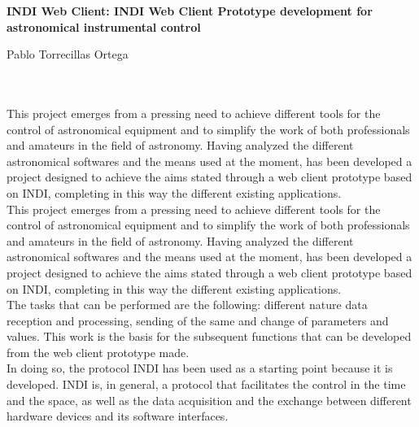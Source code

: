 \cleardoublepage


\thispagestyle{empty}


\begin{center}
{\large\bfseries INDI Web Client: INDI Web Client Prototype development for astronomical instrumental control}\\
\end{center}
\begin{center}
Pablo Torrecillas Ortega\\
\end{center}

\\

\vspace{0.7cm}
\\

This project emerges from a pressing need to achieve different tools for the control of astronomical equipment and to simplify the work of both professionals and amateurs in the field of astronomy. Having analyzed the different astronomical softwares and the means used at the moment, has been developed a project designed to achieve the aims stated through a web client prototype based on INDI, completing in this way the different existing applications.\\

This project emerges from a pressing need to achieve different tools for the control of astronomical equipment and to simplify the work of both professionals and amateurs in the field of astronomy. Having analyzed the different astronomical softwares and the means used at the moment, has been developed a project designed to achieve the aims stated through a web client prototype based on INDI, completing in this way the different existing applications.\\

The tasks that can be performed are the following: different nature data reception and processing, sending of the same and change of parameters and values. This work is the basis for the subsequent functions that can be developed from the web client prototype made.\\

In doing so, the protocol INDI has been used as a starting point because it is developed. INDI is, in general, a protocol that facilitates the control in the time and the space, as well as the data acquisition and the exchange between different hardware devices and its software interfaces.\\


